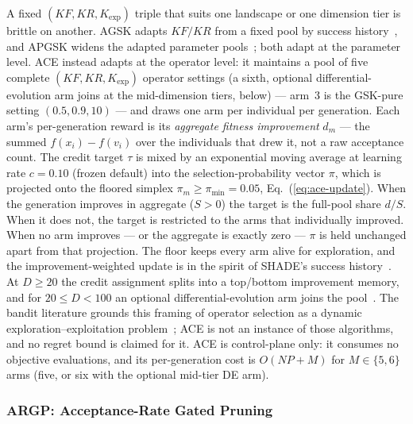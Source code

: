 A fixed $(KF, KR, K_{\exp})$ triple that suits one landscape or one
dimension tier is brittle on another.
AGSK adapts $KF/KR$ from a fixed pool by success
history~\cite{mohamed2020agsk}, and APGSK widens the adapted parameter
pools~\cite{apgsk2021}; both adapt at the parameter level.
ACE instead adapts at the operator level: it maintains a pool of five complete $(KF, KR, K_{\exp})$
operator settings (a sixth, optional differential-evolution arm joins at
the mid-dimension tiers, below) --- arm~3 is the GSK-pure setting $(0.5, 0.9, 10)$
--- and draws one arm per individual per generation. %
Each arm's per-generation reward is its \emph{aggregate fitness
improvement} $d_m$ --- the summed $f(x_i){-}f(v_i)$ over the individuals
that drew it, not a raw acceptance count. The credit target $\tau$ is mixed
by an exponential moving average at learning rate $c=0.10$ (frozen default)
into the selection-probability vector $\pi$, which is projected onto the
floored simplex $\pi_m\ge\pi_{\min}=0.05$, Eq.~(\ref{eq:ace-update}). When the
generation improves in aggregate ($S>0$) the target is the full-pool share
$d/S$. When it does not, the target is restricted to the arms that
individually improved. When no arm improves --- or the aggregate is
exactly zero --- $\pi$ is held unchanged apart from that projection. The floor keeps every arm alive for exploration, and the
improvement-weighted update is in the spirit of SHADE's success
history~\cite{tanabe2013shade}. %
At $D\ge20$ the credit assignment splits into a top/bottom improvement
memory, and for $20{\le}D{<}100$ an optional differential-evolution arm
joins the pool~\cite{storn1997differential}. %
The bandit literature grounds this framing of operator selection as a
dynamic exploration--exploitation
problem~\cite{auer2002finite,fialho2010adaptive}; ACE is not an
instance of those algorithms, and no regret bound is claimed for it.
ACE is control-plane only: it consumes no objective evaluations, and
its per-generation cost is $O(NP + M)$ for $M\in\{5,6\}$ arms (five, or six
with the optional mid-tier DE arm). %

\subsubsection{ARGP: Acceptance-Rate Gated Pruning}\label{sec:alg:argp}

